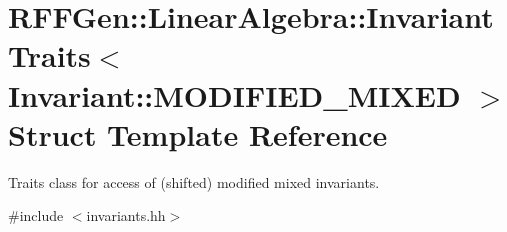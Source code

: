 \hypertarget{structRFFGen_1_1LinearAlgebra_1_1InvariantTraits_3_01Invariant_1_1MODIFIED__MIXED_01_4}{\section{R\-F\-F\-Gen\-:\-:Linear\-Algebra\-:\-:Invariant\-Traits$<$ Invariant\-:\-:M\-O\-D\-I\-F\-I\-E\-D\-\_\-\-M\-I\-X\-E\-D $>$ Struct Template Reference}
\label{structRFFGen_1_1LinearAlgebra_1_1InvariantTraits_3_01Invariant_1_1MODIFIED__MIXED_01_4}
}


Traits class for access of (shifted) modified mixed invariants.  




{\ttfamily \#include $<$invariants.\-hh$>$}

